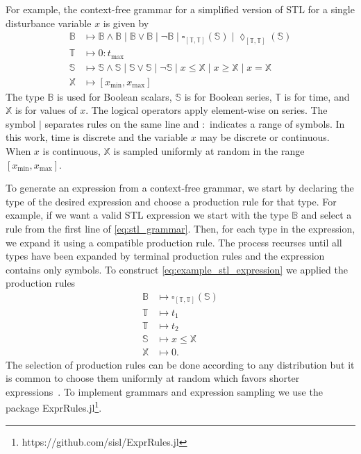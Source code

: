 For example, the context-free grammar for a simplified version of STL for a single disturbance variable $x$ is given by
\begin{equation}
\label{eq:stl_grammar}
\begin{split}
    \mathbb{B} &\mapsto \mathbb{B} \land \mathbb{B} \mid \mathbb{B} \lor \mathbb{B} \mid \neg \mathbb{B} \mid \square_{[\mathbb{T},\mathbb{T}]}(\mathbb{S}) \mid \lozenge_{[\mathbb{T},\mathbb{T}]}(\mathbb{S}) \\
    \mathbb{T} &\mapsto 0:t_{\max} \\
    \mathbb{S} &\mapsto \mathbb{S} \land \mathbb{S} \mid \mathbb{S} \lor \mathbb{S} \mid \neg \mathbb{S} \mid x \leq \mathbb{X} \mid x \geq \mathbb{X} \mid x = \mathbb{X} \\
    \mathbb{X} &\mapsto [x_{\min},x_{\max}]
\end{split}
\end{equation}
The type $\mathbb{B}$ is used for Boolean scalars, $\mathbb{S}$ is for Boolean series, $\mathbb{T}$ is for time, and $\mathbb{X}$ is for values of $x$. The logical operators apply element-wise on series. The symbol $\mid$ separates rules on the same line and $:$ indicates a range of symbols. In this work, time is discrete and the variable $x$ may be discrete or continuous. When $x$ is continuous, $\mathbb{X}$ is sampled uniformly at random in the range $[x_{\min}, x_{\max}]$.

To generate an expression from a context-free grammar, we start by declaring the type of the desired expression and choose a production rule for that type. For example, if we want a valid STL expression we start with the type $\mathbb{B}$ and select a rule from the first line of \cref{eq:stl_grammar}. Then, for each type in the expression, we expand it using a compatible production rule. The process recurses until all types have been expanded by terminal production rules and the expression contains only symbols. To construct \cref{eq:example_stl_expression} we applied the production rules
\begin{align}
    \mathbb{B} &\mapsto \square_{[\mathbb{T},\mathbb{T}]}(\mathbb{S}) \\
    \mathbb{T} &\mapsto t_1 \\
    \mathbb{T} &\mapsto t_2 \\
    \mathbb{S} &\mapsto x \leq \mathbb{X} \\
    \mathbb{X} &\mapsto 0 \text{.}
\end{align}
The selection of production rules can be done according to any distribution but it is common to choose them uniformly at random which favors shorter expressions~\cite{kochenderfer2019algorithms}. To implement grammars and expression sampling we use the package ExprRules.jl\footnote{https://github.com/sisl/ExprRules.jl}.


